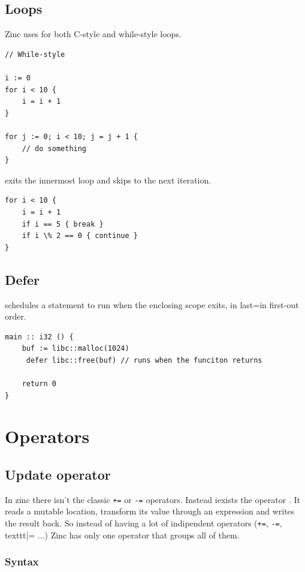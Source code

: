 \subsection{Loops}

Zinc uses  for both C-style and while-style loops.
\begin{lstlisting}[style=zinc, caption={Loop forms}]
// While-style

i := 0
for i < 10 {
    i = i + 1
}

for j := 0; i < 10; j = j + 1 {
    // do something
}
\end{lstlisting}

 exits the innermost loop and  skips to the next iteration.

\begin{lstlisting}[style=zinc, caption={break and continue}]
for i < 10 {
    i = i + 1
    if i == 5 { break }
    if i \% 2 == 0 { continue }
}
\end{lstlisting}

\subsection{Defer}

 schedules a statement to run when the enclosing scope exits, in last=in first-out order.

\begin{lstlisting}[style=zinc, caption={Defer}]
main :: i32 () {
    buf := libc::malloc(1024)
     defer libc::free(buf) // runs when the funciton returns

    return 0
}
\end{lstlisting}

\section{Operators}

\subsection{Update operator}
In zinc there isn't the classic \texttt{+=} or \texttt{-=} operators.
Instead iexists the operator \zn{:}. It reads a mutable location, transform its value through an expression and writes the result back.
So instead of having a lot of indipendent operators (\texttt{+=}, \texttt{-=}, texttt{|=} ...)
Zinc has only one operator that groups all of them.

\subsubsection*{Syntax}

